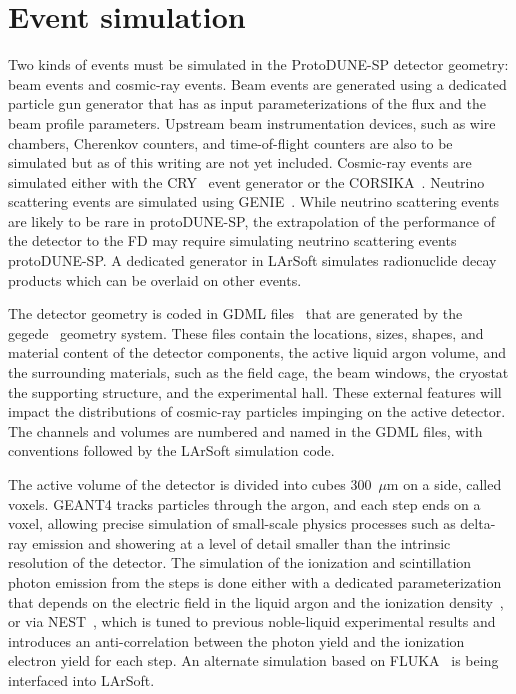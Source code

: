 \section{Event simulation}
\label{sec:larsoftsim}

Two kinds of events must be simulated in the ProtoDUNE-SP detector
geometry: beam events and cosmic-ray events.  Beam events are
generated using a dedicated particle gun generator that has as input
parameterizations of the flux and the beam profile parameters.
Upstream beam instrumentation devices, such as wire chambers,
Cherenkov counters, and time-of-flight counters are also to be
simulated but as of this writing are not yet included.  Cosmic-ray
events are simulated either with the CRY~\cite{cry} event generator or
the CORSIKA~\cite{corsika}.  Neutrino scattering events are simulated
using GENIE~\cite{genie}.  While neutrino scattering events are likely
to be rare in protoDUNE-SP, the extrapolation of the performance of
the detector to the FD may require simulating neutrino scattering
events protoDUNE-SP.  A dedicated generator in LArSoft simulates
radionuclide decay products which can be overlaid on other events.

The detector geometry is coded in GDML files~\cite{geant4} that are
generated by the gegede~\cite{gegede} geometry system.  These files
contain the locations, sizes, shapes, and material content of the
detector components, the active liquid argon volume, and the
surrounding materials, such as the field cage, the beam windows, the
cryostat the supporting structure, and the experimental hall.  These
external features will impact the distributions of cosmic-ray
particles impinging on the active detector.  The channels and volumes
are numbered and named in the GDML files, with conventions followed by
the LArSoft simulation code.

The active volume of the detector is divided into cubes 300~$\mu$m on
a side, called voxels.  GEANT4 tracks particles through the argon, and
each step ends on a voxel, allowing precise simulation of small-scale
physics processes such as delta-ray emission and showering at a level
of detail smaller than the intrinsic resolution of the detector.  The
simulation of the ionization and scintillation photon emission from
the steps is done either with a dedicated parameterization that
depends on the electric field in the liquid argon and the ionization
density~\cite{birks}, or via NEST~\cite{nest}, which is tuned to
previous noble-liquid experimental results and introduces an
anti-correlation between the photon yield and the ionization electron
yield for each step.  An alternate simulation based on
FLUKA~\cite{fluka} is being interfaced into LArSoft.


